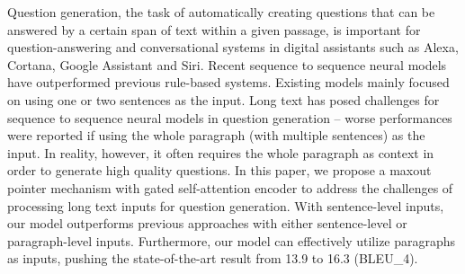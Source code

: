 Question generation, the task of automatically creating questions that can be answered by a certain span of text within a given passage, is important for question-answering and conversational systems in digital assistants such as Alexa, Cortana, Google Assistant and Siri. Recent sequence to sequence neural models have outperformed previous rule-based systems. Existing models mainly focused on using one or two sentences as the input. Long text has posed challenges for sequence to sequence neural models in question generation -- worse performances were reported if using the whole paragraph (with multiple sentences) as the input. In reality, however, it often requires the whole paragraph as context in order to generate high quality questions. In this paper, we propose a maxout pointer mechanism with gated self-attention encoder to address the challenges of processing long text inputs for question generation. With sentence-level inputs, our model outperforms previous approaches with either sentence-level or paragraph-level inputs. Furthermore, our model can effectively utilize paragraphs as inputs, pushing the state-of-the-art result from 13.9 to 16.3 (BLEU\_4).
